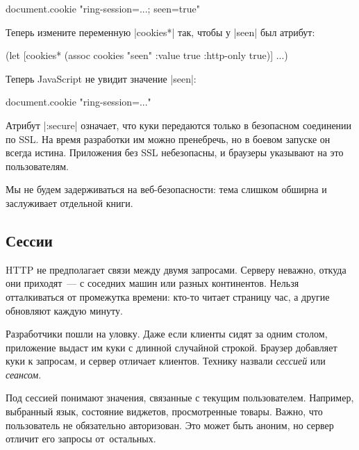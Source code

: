 \begin{english}
  \begin{js}
document.cookie
"ring-session=...; seen=true"
  \end{js}
\end{english}

Теперь измените переменную \spverb|cookies*| так, чтобы у \spverb|seen| был
атрибут:

\begin{english}
  \begin{clojure}
(let [cookies* (assoc cookies "seen"
                      {:value true :http-only true})]
  ...)
  \end{clojure}
\end{english}

Теперь JavaScript не увидит значение \spverb|seen|:

\begin{english}
  \begin{js}
document.cookie
"ring-session=..."
  \end{js}
\end{english}

Атрибут \spverb|:secure| означает, что куки передаются только в безопасном
соединении по SSL. На время разработки им можно пренебречь, но в боевом запуске
он всегда истина. Приложения без SSL небезопасны, и браузеры указывают на это
пользователям.

Мы не будем задерживаться на веб-безопасности: тема слишком обширна и
заслуживает отдельной книги.

\subsection{Сессии}


HTTP не предполагает связи между двумя запросами. Серверу неважно, откуда они
приходят~--- с соседних машин или разных континентов. Нельзя отталкиваться от
промежутка времени: кто-то читает страницу час, а другие обновляют каждую
минуту.

Разработчики пошли на уловку. Даже если клиенты сидят за одним столом,
приложение выдаст им куки с длинной случайной строкой. Браузер добавляет куки к
запросам, и сервер отличает клиентов. Технику назвали \emph{сессией} или
\emph{сеансом}.

Под сессией понимают значения, связанные с текущим пользователем. Например,
выбранный язык, состояние виджетов, просмотренные товары. Важно, что
пользователь не обязательно авторизован. Это может быть аноним, но сервер
отличит его запросы от~остальных.

